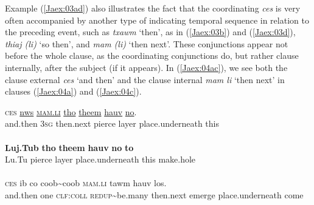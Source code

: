 \documentclass[output=paper]{LSP/langsci}
\begin{document}
Example (\ref{Jaex:03ad}) also illustrates the fact that the coordinating  \textit{ces} is very often accompanied by another type of  indicating temporal sequence in relation to the preceding event, such as \textit{txawm} `then', as in (\ref{Jaex:03b}) and (\ref{Jaex:03d}), \textit{thiaj (li) } `so then', and \textit{mam (li) } `then next'. These  conjunctions appear not before the whole clause, as the coordinating conjunctions do, but rather clause internally, after the subject (if it appears). In (\ref{Jaex:04ac}), we see both the clause external \textit{ces} `and then' and the clause internal \textit{mam li } `then next' in clauses (\ref{Jaex:04a}) and (\ref{Jaex:04c}). 

\begin{exe}
\ex \label{Jaex:04ac}
\begin{xlist}
\ex \label{Jaex:04a}
\gll \textsc{ces} \underline{nws} \underline{\textsc{mam.li}} \underline{tho} \underline{theem} \underline{hauv} \underline{no}.\\
and.then 3\textsc{sg} then.next pierce layer place.underneath this\\
\glt {}\\
\ex \label{Jaex:04b}
\gll \textbf{Luj.Tub} \textbf{tho} \textbf{theem} \textbf{hauv} \textbf{no} \textbf{to}\\
Lu.Tu  pierce layer  place.underneath  this make.hole\\ 
\glt {}\\
\ex \label{Jaex:04c}
\gll \textsc{ces} ib co coob{\textasciitilde}coob \textsc{mam.li} tawm hauv los.\\     	      
     and.then one \textsc{clf:coll} \textsc{redup}{\textasciitilde}be.many then.next emerge place.underneath come\\
\glt {} \citep[][12]{johnson92}
\end{xlist}
\end{exe}
\end{document}
